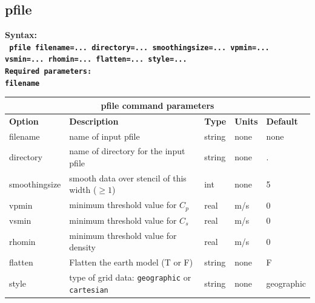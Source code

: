 \documentclass[11pt]{report}
\begin{document}
\subsection{pfile}
\label{keyword:pfile}
\begin{flushleft}\bf
Syntax:\\
\tt
pfile filename=... directory=... smoothingsize=... vpmin=... vsmin=... rhomin=... flatten=... style=... \\
\bf Required parameters:\\
\tt filename
\end{flushleft}
%
\begin{center}
\begin{tabular}{|l|p{8cm}|l|l||l|} \hline
\multicolumn{5}{|c|}{\bf pfile command parameters}\\ \hline
{\bf Option} & {\bf Description}                        & {\bf Type} & {\bf Units} & {\bf Default} \\ \hline 
\hline
filename      & name of input pfile                     & string  & none & none \\ \hline
directory     & name of directory for the input pfile   & string  & none & . \\ \hline
smoothingsize & smooth data over stencil of this width ($\geq 1$) & int & none & 5 \\ \hline
vpmin         & minimum threshold value for $C_p$       & real    & m/s  & 0  \\ \hline
vsmin         & minimum threshold value for $C_s$       & real    & m/s  & 0  \\ \hline
rhomin        & minimum threshold value for density     & real    & m/s  & 0  \\ \hline
flatten       & Flatten the earth model (T or F)        & string  & none & F  \\ \hline
style         & type of grid data: {\tt geographic} or {\tt cartesian} & string  & none & geographic \\ \hline
\end{tabular}
\end{center}


%
\end{document}
